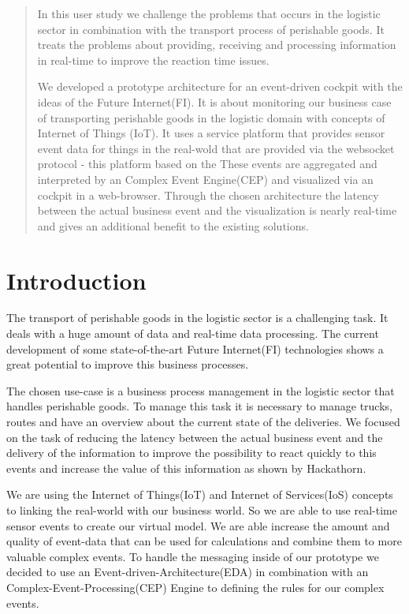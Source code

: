 \documentclass{acm_proc_article-sp}
\begin{document}
\maketitle
\begin{abstract}
In this user study we challenge the problems that occurs in the logistic sector in combination with the transport process of perishable goods.
It treats the problems about providing, receiving and processing information in real-time to improve the reaction time issues.

We developed a prototype architecture for an event-driven cockpit with the ideas of the Future Internet(FI). It is about monitoring our business case of transporting perishable goods in the logistic domain with concepts of Internet of Things (IoT). 
It uses a service platform that provides sensor event data for things in the real-wold that are provided via the websocket protocol - this platform based on the 
These events are aggregated and interpreted by an Complex Event Engine(CEP) and visualized via an cockpit in a web-browser.
Through the chosen architecture the latency between the actual business event and the visualization is nearly real-time and gives an additional benefit to the existing solutions.
\end{abstract}


\section{Introduction}
The transport of perishable goods in the logistic sector is a challenging task. It deals with a huge amount of data and real-time data processing.
The current development of some state-of-the-art Future Internet(FI) technologies shows a great potential to improve this business processes.

The chosen use-case is a business process management in the logistic sector that handles  perishable goods. To manage this task it is necessary to manage trucks, routes and have an overview about the current state of the deliveries. We focused on the task of reducing the latency between the actual business event and the delivery of the information to improve the possibility to react quickly to this events and increase the value of this information as shown by Hackathorn\cite{hackathron:real_time_to_real_value}.

We are using the Internet of Things(IoT) and Internet of Services(IoS) concepts to linking the real-world with our business world. So we are able to use real-time sensor events to create our virtual model. We are able increase the amount and quality of event-data that can be used for calculations and combine them to more valuable complex events.
To handle the messaging inside of our prototype we decided to use an Event-driven-Architecture(EDA) in combination with an Complex-Event-Processing(CEP) Engine to defining the rules for our complex events.
\end{document}
